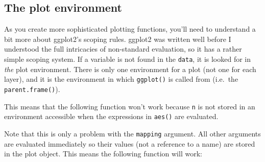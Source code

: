 \subsection{The plot environment}

As you create more sophisticated plotting functions, you'll need to
understand a bit more about ggplot2's scoping rules. ggplot2 was written
well before I understood the full intricacies of non-standard
evaluation, so it has a rather simple scoping system. If a variable is
not found in the \texttt{data}, it is looked for in \emph{the} plot
environment. There is only one environment for a plot (not one for each
layer), and it is the environment in which \texttt{ggplot()} is called
from (i.e.~the \texttt{parent.frame()}). 

This means that the following function won't work because \texttt{n} is
not stored in an environment accessible when the expressions in
\texttt{aes()} are evaluated.

\begin{Shaded}
\begin{Highlighting}[]
\StringTok{ }
  \StringTok{ }
  \NormalTok{(}\StringTok{ }
\NormalTok{\}}
\StringTok{ }\NormalTok{(} \NormalTok{:}\NormalTok{, } \NormalTok{:}\NormalTok{)}
\StringTok{ }\NormalTok{()}
\end{Highlighting}
\end{Shaded}

Note that this is only a problem with the \texttt{mapping} argument. All
other arguments are evaluated immediately so their values (not a
reference to a name) are stored in the plot object. This means the
following function will work:

\begin{Shaded}
\begin{Highlighting}[]
\StringTok{ }
  \NormalTok{(} 
\NormalTok{\}}
\StringTok{ }\NormalTok{()}
\end{Highlighting}
\end{Shaded}

